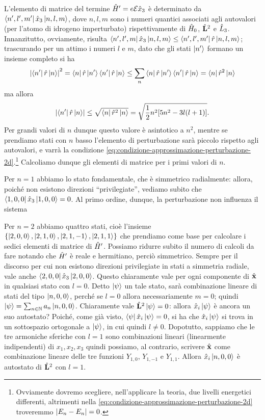 L'elemento di matrice del termine $\hat{H}'=e\mathcal E\hat{x}_3$ è determinato da $\left\langle{n',l',m'}\right|\hat{x}_3\left|{n,l,m}\right\rangle$, dove $n,l,m$ sono i numeri quantici associati agli autovalori (per l'atomo di idrogeno imperturbato) rispettivamente di $\hat{H}_0$, $\hat{\mathbf{L}}^2$ e $\hat{L}_3$.
Innanzitutto, ovviamente, risulta $\left\langle{n',l',m}\right|\hat{x}_3\left|{n,l,m}\right\rangle\leq\left\langle{n',l',m'}\right|\hat{r}\left|{n,l,m}\right\rangle$; trascurando per un attimo i numeri $l$ e $m$, dato che gli stati $\left|{n'}\right\rangle$ formano un insieme completo si ha
\begin{equation}
	\left|{\left\langle{n'}\right|\hat{r}\left|{n}\right\rangle}\right|^2=\left\langle{n}\right|\hat{r}\left|{n'}\right\rangle\left\langle{n'}\right|\hat{r}\left|{n}\right\rangle\leq\sum_n\left\langle{n}\right|\hat{r}\left|{n'}\right\rangle\left\langle{n'}\right|\hat{r}\left|{n}\right\rangle=\left\langle{n}\right|\hat{r}^2\left|{n}\right\rangle
\end{equation}
ma allora
\begin{equation}
	\left|{\left\langle{n'}\right|\hat{r}\left|{n}\right\rangle}\right|\leq\sqrt{\left\langle{n}\right|\hat{r}^2\left|{n}\right\rangle}=\sqrt{\frac12n^2[5n^2-3l(l+1)]}.
\end{equation}
Per grandi valori di $n$ dunque questo valore è asintotico a $n^2$, mentre se prendiamo stati con $n$ basso l'elemento di perturbazione sarà piccolo rispetto agli autovalori, e varrà la condizione \eqref{eq:condizione-approssimazione-perturbazione-2d}.\footnote{Ovviamente dovremo scegliere, nell'applicare la teoria, due livelli energetici differenti, altrimenti nella \eqref{eq:condizione-approssimazione-perturbazione-2d} troveremmo $\left|{E_n-E_n}\right|=0$.}
Calcoliamo dunque gli elementi di matrice per i primi valori di $n$.

Per $n=1$ abbiamo lo stato fondamentale, che è simmetrico radialmente: allora, poich\'e non esistono direzioni ``privilegiate'', vediamo subito che $\left\langle{1,0,0}\right|\hat{x}_3\left|{1,0,0}\right\rangle=0$.
Al primo ordine, dunque, la perturbazione non influenza il sistema

Per $n=2$ abbiamo quattro stati, cioè l'insieme $\{\left|{2,0,0}\right\rangle,\left|{2,1,0}\right\rangle,\left|{2,1,-1}\right\rangle,\left|{2,1,1}\right\rangle\}$ che prendiamo come base per calcolare i sedici elementi di matrice di $\hat{H}'$.
Possiamo ridurre subito il numero di calcoli da fare notando che $\hat{H}'$ è reale e hermitiano, perciò simmetrico.
Sempre per il discorso per cui non esistono direzioni privilegiate in stati a simmetria radiale, vale anche $\left\langle{2,0,0}\right|\hat{x}_3\left|{2,0,0}\right\rangle$.
Questo chiaramente vale per ogni componente di $\hat{\mathbf{x}}$ in qualsiasi stato con $l=0$.
Detto $\left|{\psi}\right\rangle$ un tale stato, sarà combinazione lineare di stati del tipo $\left|{n,0,0}\right\rangle$, perch\'e se $l=0$ allora necessariamente $m=0$; quindi $\left|{\psi}\right\rangle=\sum_{n\in\mathbb{N}}a_n\left|{n,0,0}\right\rangle$.
Chiaramente vale $\hat{\mathbf{L}}^2\left|{\psi}\right\rangle=0$: allora $\hat{x}_i\left|{\psi}\right\rangle$ è ancora un suo autostato?
Poich\'e, come già visto, $\left\langle{\psi}\right|\hat{x}_i\left|{\psi}\right\rangle=0$, si ha che $\hat{x}_i\left|{\psi}\right\rangle$ si trova in un sottospazio ortogonale a $\left|{\psi}\right\rangle$, in cui quindi $l\ne 0$.
Dopotutto, sappiamo che le tre armoniche sferiche con $l=1$ sono combinazioni lineari (linearmente indipendenti) di $x_1,x_2,x_3$ quindi possiamo, al contrario, scrivere $\hat{\mathbf{x}}$ come combinazione lineare delle tre funzioni $Y_{1,0}$, $Y_{1,-1}$ e $Y_{1,1}$.
Allora $\hat{x}_i\left|{n,0,0}\right\rangle$ è autostato di $\hat{\mathbf{L}}^2$ con $l=1$.

